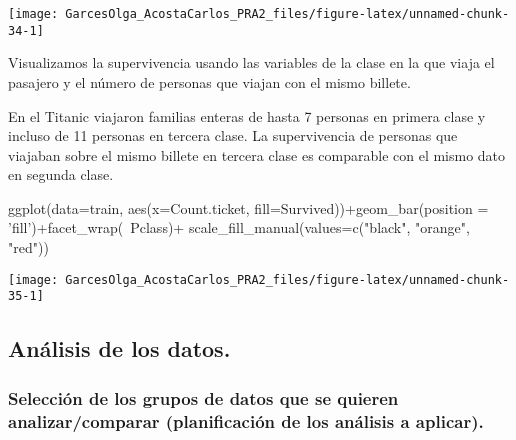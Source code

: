 \documentclass[
]{article}
\newenvironment{Shaded}{\begin{snugshade}}{\end{snugshade}}
\newcommand{\DataTypeTok}[1]{\textcolor[rgb]{0.87,0.87,0.75}{#1}}
\newcommand{\KeywordTok}[1]{\textcolor[rgb]{0.94,0.87,0.69}{#1}}
\newcommand{\NormalTok}[1]{\textcolor[rgb]{0.80,0.80,0.80}{#1}}
\newcommand{\OperatorTok}[1]{\textcolor[rgb]{0.94,0.94,0.82}{#1}}
\newcommand{\StringTok}[1]{\textcolor[rgb]{0.80,0.58,0.58}{#1}}
\begin{document}
\begin{center}\texttt{[image: GarcesOlga\_AcostaCarlos\_PRA2\_files/figure-latex/unnamed-chunk-34-1]} \end{center}

Visualizamos la supervivencia usando las variables de la clase en la que
viaja el pasajero y el número de personas que viajan con el mismo
billete.

En el Titanic viajaron familias enteras de hasta 7 personas en primera
clase y incluso de 11 personas en tercera clase. La supervivencia de
personas que viajaban sobre el mismo billete en tercera clase es
comparable con el mismo dato en segunda clase.

\begin{Shaded}
\begin{Highlighting}[]
\KeywordTok{ggplot}\NormalTok{(}\DataTypeTok{data=}\NormalTok{train, }\KeywordTok{aes}\NormalTok{(}\DataTypeTok{x=}\NormalTok{Count.ticket, }\DataTypeTok{fill=}\NormalTok{Survived))}\OperatorTok{+}\KeywordTok{geom_bar}\NormalTok{(}\DataTypeTok{position =} \StringTok{'fill'}\NormalTok{)}\OperatorTok{+}\KeywordTok{facet_wrap}\NormalTok{(}\OperatorTok{~}\NormalTok{Pclass)}\OperatorTok{+}\StringTok{ }\KeywordTok{scale_fill_manual}\NormalTok{(}\DataTypeTok{values=}\KeywordTok{c}\NormalTok{(}\StringTok{"black"}\NormalTok{, }\StringTok{"orange"}\NormalTok{, }\StringTok{"red"}\NormalTok{))}
\end{Highlighting}
\end{Shaded}

\begin{center}\texttt{[image: GarcesOlga\_AcostaCarlos\_PRA2\_files/figure-latex/unnamed-chunk-35-1]} \end{center}

\hypertarget{anuxe1lisis-de-los-datos.}{%
\subsection{Análisis de los datos.}\label{anuxe1lisis-de-los-datos.}}

\hypertarget{selecciuxf3n-de-los-grupos-de-datos-que-se-quieren-analizarcomparar-planificaciuxf3n-de-los-anuxe1lisis-a-aplicar.}{%
\subsubsection{Selección de los grupos de datos que se quieren
analizar/comparar (planificación de los análisis a
aplicar).}\label{selecciuxf3n-de-los-grupos-de-datos-que-se-quieren-analizarcomparar-planificaciuxf3n-de-los-anuxe1lisis-a-aplicar.}}
\end{document}
